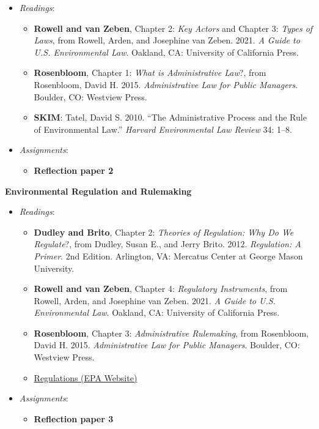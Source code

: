 \begin{itemize}

\item
  \emph{Readings}:

  \begin{itemize}
  
  \item
    \textbf{Rowell and van Zeben}, Chapter 2: \emph{Key Actors} and
    Chapter 3: \emph{Types of Laws}, from Rowell, Arden, and Josephine
    van Zeben. 2021. \emph{A Guide to U.S. Environmental Law}. Oakland,
    CA: University of California Press.
  \item
    \textbf{Rosenbloom}, Chapter 1: \emph{What is Administrative Law}?,
    from Rosenbloom, David H. 2015. \emph{Administrative Law for Public
    Managers}. Boulder, CO: Westview Press.
  \item
    \textbf{SKIM}: Tatel, David S. 2010. ``The Administrative Process
    and the Rule of Environmental Law.'' \emph{Harvard Environmental Law
    Review} 34: 1--8.
  \end{itemize}
\item
  \emph{Assignments}:

  \begin{itemize}
  
  \item
    \textbf{Reflection paper 2}
  \end{itemize}
\end{itemize}

\week \textbf{Environmental Regulation and Rulemaking}

\begin{itemize}

\item
  \emph{Readings}:

  \begin{itemize}
  
  \item
    \textbf{Dudley and Brito}, Chapter 2: \emph{Theories of Regulation:
    Why Do We Regulate}?, from Dudley, Susan E., and Jerry Brito. 2012.
    \emph{Regulation: A Primer}. 2nd Edition. Arlington, VA: Mercatus
    Center at George Mason University.
  \item
    \textbf{Rowell and van Zeben}, Chapter 4: \emph{Regulatory
    Instruments}, from Rowell, Arden, and Josephine van Zeben. 2021.
    \emph{A Guide to U.S. Environmental Law}. Oakland, CA: University of
    California Press.
  \item
    \textbf{Rosenbloom}, Chapter 3: \emph{Administrative Rulemaking},
    from Rosenbloom, David H. 2015. \emph{Administrative Law for Public
    Managers}. Boulder, CO: Westview Press.
  \item
    \href{https://www.epa.gov/laws-regulations/regulations}{Regulations
    (EPA Website)}
  \end{itemize}
\item
  \emph{Assignments}:

  \begin{itemize}
  
  \item
    \textbf{Reflection paper 3}
  \end{itemize}
\end{itemize}

